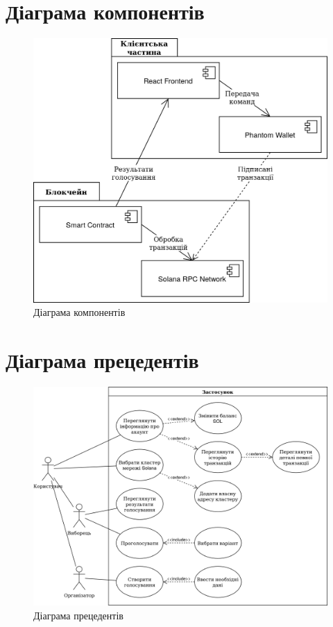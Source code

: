 \documentclass[14pt]{extreport}
\begin{document}
  \appendix
  \renewcommand{\thechapter}{\Alph{chapter}}
  \renewcommand{\chaptername}{Додаток}
  
  \chapter{Діаграма компонентів}
  \label{app:UMLComponent}
  
  \begin{figure}[H]
    \centering
    \includegraphics[scale=0.31]{UMLComponent}
    \caption{Діаграма компонентів}
  \end{figure}
  
  \chapter{Діаграма прецедентів}
  \label{app:UMLUseCase}
  
  \begin{figure}[H]
    \centering
    \includegraphics[scale=0.21]{UMLUseCase}
    \caption{Діаграма прецедентів}
  \end{figure}
  
\end{document}
